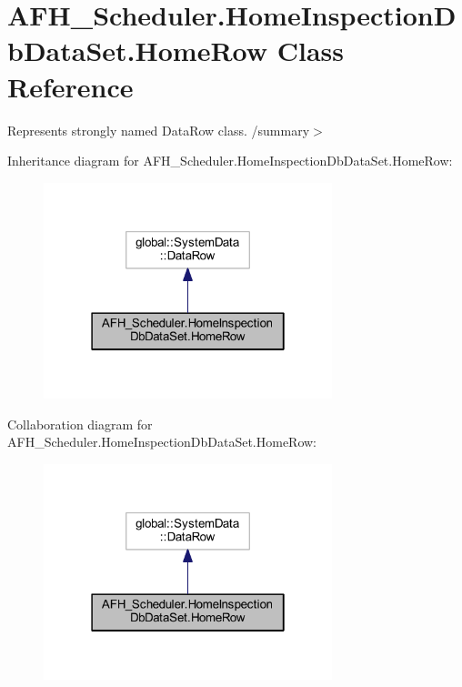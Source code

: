 \section{A\+F\+H\+\_\+\+Scheduler.\+Home\+Inspection\+Db\+Data\+Set.\+Home\+Row Class Reference}
\label{class_a_f_h___scheduler_1_1_home_inspection_db_data_set_1_1_home_row}


Represents strongly named Data\+Row class. /summary$>$  




Inheritance diagram for A\+F\+H\+\_\+\+Scheduler.\+Home\+Inspection\+Db\+Data\+Set.\+Home\+Row\+:
\nopagebreak
\begin{figure}[H]
\begin{center}
\leavevmode
\includegraphics[width=238pt]{class_a_f_h___scheduler_1_1_home_inspection_db_data_set_1_1_home_row__inherit__graph}
\end{center}
\end{figure}


Collaboration diagram for A\+F\+H\+\_\+\+Scheduler.\+Home\+Inspection\+Db\+Data\+Set.\+Home\+Row\+:
\nopagebreak
\begin{figure}[H]
\begin{center}
\leavevmode
\includegraphics[width=238pt]{class_a_f_h___scheduler_1_1_home_inspection_db_data_set_1_1_home_row__coll__graph}
\end{center}
\end{figure}
